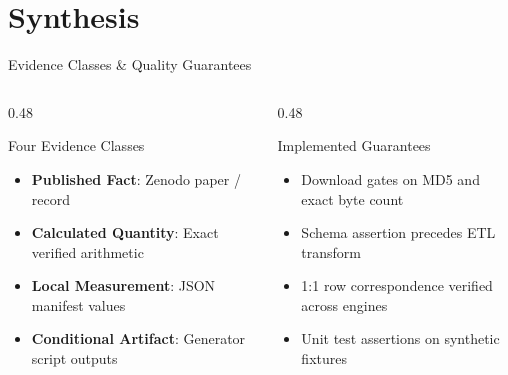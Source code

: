 \documentclass[aspectratio=169]{beamer}
\begin{document}
\section{Synthesis}
\begin{frame}{Evidence Classes \& Quality Guarantees}
  \begin{columns}[T]
    \begin{column}{0.48\textwidth}
      \begin{block}{Four Evidence Classes}
        \tiny
        \begin{itemize}
          \item[\textbf{P}] \textbf{Published Fact}: Zenodo paper / record
          \item[\textbf{C}] \textbf{Calculated Quantity}: Exact verified arithmetic
          \item[\textbf{L}] \textbf{Local Measurement}: JSON manifest values
          \item[\textbf{A}] \textbf{Conditional Artifact}: Generator script outputs
        \end{itemize}
      \end{block}
    \end{column}
    \begin{column}{0.48\textwidth}
      \begin{exampleblock}{Implemented Guarantees}
        \tiny
        \begin{itemize}
          \item Download gates on MD5 and exact byte count
          \item Schema assertion precedes ETL transform
          \item 1:1 row correspondence verified across engines
          \item Unit test assertions on synthetic fixtures
        \end{itemize}
      \end{exampleblock}
    \end{column}
  \end{columns}
\end{frame}
\end{document}
